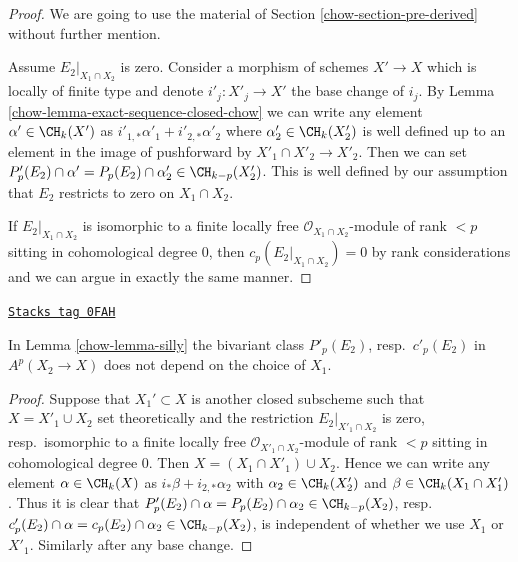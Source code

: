 \begin{proof}

We are going to use the material of Section \ref{chow-section-pre-derived}
without further mention.

\medskip\noindent
Assume $E_2|_{X_1 \cap X_2}$ is zero.
Consider a morphism of schemes $X' \to X$
which is locally of finite type and denote $i'_j : X'_j \to X'$ the
base change of $i_j$. By Lemma \ref{chow-lemma-exact-sequence-closed-chow}
we can write any element $\alpha' \in \CH_k(X')$ as
$i'_{1, *}\alpha'_1 + i'_{2, *}\alpha'_2$ where
$\alpha'_2 \in \CH_k(X'_2)$
is well defined up to an element in the image of pushforward
by $X'_1 \cap X'_2 \to X'_2$. Then we can set
$P'_p(E_2) \cap \alpha' = P_p(E_2) \cap \alpha'_2 \in \CH_{k - p}(X'_2)$. This
is well defined by our assumption that $E_2$ restricts
to zero on $X_1 \cap X_2$.

\medskip\noindent
If $E_2|_{X_1 \cap X_2}$ is isomorphic to a finite locally free
$\mathcal{O}_{X_1 \cap X_2}$-module of rank $< p$ sitting in
cohomological degree $0$, then $c_p(E_2|_{X_1 \cap X_2}) = 0$
by rank considerations and we can argue in exactly the same manner.
\end{proof}

\begin{lemma}
\label{chow-lemma-silly-independent}
\href{https://stacks.math.columbia.edu/tag/0FAH}{\texttt{Stacks tag 0FAH}}

In Lemma \ref{chow-lemma-silly} the bivariant class
$P'_p(E_2)$, resp.\ $c'_p(E_2)$ in $A^p(X_2 \to X)$
does not depend on the choice of $X_1$.
\end{lemma}

\begin{proof}
Suppose that $X_1' \subset X$ is another closed subscheme such that
$X = X'_1 \cup X_2$ set theoretically and the restriction
$E_2|_{X'_1 \cap X_2}$ is zero, resp.\ isomorphic to a
finite locally free $\mathcal{O}_{X'_1 \cap X_2}$-module
of rank $< p$ sitting in cohomological degree $0$.
Then $X = (X_1 \cap X'_1) \cup X_2$. Hence we can write
any element $\alpha \in \CH_k(X)$ as $i_*\beta + i_{2, *}\alpha_2$ with
$\alpha_2 \in \CH_k(X'_2)$ and $\beta \in \CH_k(X_1 \cap X'_1)$.
Thus it is clear that
$P'_p(E_2) \cap \alpha = P_p(E_2) \cap \alpha_2 \in \CH_{k - p}(X_2)$,
resp.\  $c'_p(E_2) \cap \alpha = c_p(E_2) \cap \alpha_2 \in \CH_{k - p}(X_2)$,
is independent of whether we use $X_1$ or $X'_1$. Similarly
after any base change.
\end{proof}

